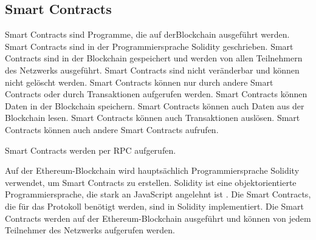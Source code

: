\subsection{Smart Contracts}
Smart Contracts sind Programme, die auf derBlockchain ausgeführt werden. Smart Contracts 
sind in der Programmiersprache Solidity geschrieben. Smart Contracts sind in der Blockchain
gespeichert und werden von allen Teilnehmern des Netzwerks ausgeführt. Smart Contracts sind
nicht veränderbar und können nicht gelöscht werden. Smart Contracts können nur durch andere
Smart Contracts oder durch Transaktionen aufgerufen werden. Smart Contracts können Daten
in der Blockchain speichern. Smart Contracts können auch Daten aus der Blockchain lesen.
Smart Contracts können auch Transaktionen auslösen. Smart Contracts können auch andere
Smart Contracts aufrufen.

Smart Contracts werden per RPC aufgerufen.

Auf der Ethereum-Blockchain wird hauptsächlich Programmiersprache Solidity verwendet, um Smart Contracts zu erstellen. Solidity ist eine objektorientierte Programmiersprache, die stark an JavaScript angelehnt ist \parencite[S. 131]{Antonopoulos_MasteringEthereum}. Die Smart Contracts, die für das Protokoll benötigt werden, sind in Solidity implementiert. Die Smart Contracts werden auf der Ethereum-Blockchain ausgeführt und können von jedem Teilnehmer des Netzwerks aufgerufen werden.
